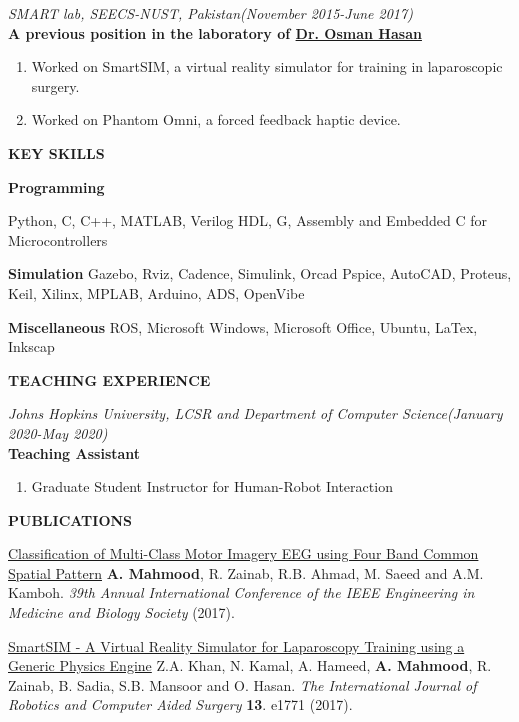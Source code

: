 \textit{SMART lab, SEECS-NUST, Pakistan\hfill(November 2015-June 2017)}\\
\textbf{\rmfamily A previous position in the laboratory of \ul{Dr. Osman Hasan}}

\begin{enumerate}
\item Worked on SmartSIM, a virtual reality simulator for training in laparoscopic surgery.
\item Worked on Phantom Omni, a forced feedback haptic device.
\end{enumerate}

\textbf{KEY SKILLS}

\textbf{\rmfamily Programming}

\textrm{\noindent Python, C, C++, MATLAB, Verilog HDL, G, Assembly and Embedded C for Microcontrollers}

\textbf{\rmfamily Simulation}
\textrm{\noindent Gazebo, Rviz, Cadence, Simulink, Orcad Pspice, AutoCAD, Proteus, Keil, Xilinx, MPLAB, Arduino, ADS, OpenVibe}

\textbf{\rmfamily Miscellaneous}
\textrm{\noindent ROS, Microsoft Windows, Microsoft Office, Ubuntu, LaTex, Inkscap}

\textbf{TEACHING EXPERIENCE}

\textit{Johns Hopkins University, LCSR and Department of Computer Science\hfill(January 2020-May 2020)}\\
\textbf{\rmfamily Teaching Assistant}
\begin{enumerate}
\item Graduate Student Instructor for Human-Robot Interaction 
\end{enumerate}


\textbf{PUBLICATIONS}

\rmfamily

{\color{blue} \ul{Classification of Multi-Class Motor Imagery EEG using Four Band Common Spatial Pattern}} 
\textbf{A. Mahmood}, R. Zainab, R.B. Ahmad, M. Saeed and 
A.M. Kamboh. \textit{39th Annual International Conference of the IEEE Engineering in Medicine and Biology Society} (2017).

{\color{blue} \ul{SmartSIM - A Virtual Reality Simulator for Laparoscopy Training using a Generic Physics Engine}} 
Z.A. Khan, N. Kamal, A. Hameed, \textbf{A. Mahmood}, R. Zainab, B. Sadia, S.B. Mansoor and 
O. Hasan. \textit{The International Journal of Robotics and Computer Aided Surgery} \textbf{13}. e1771 (2017).

